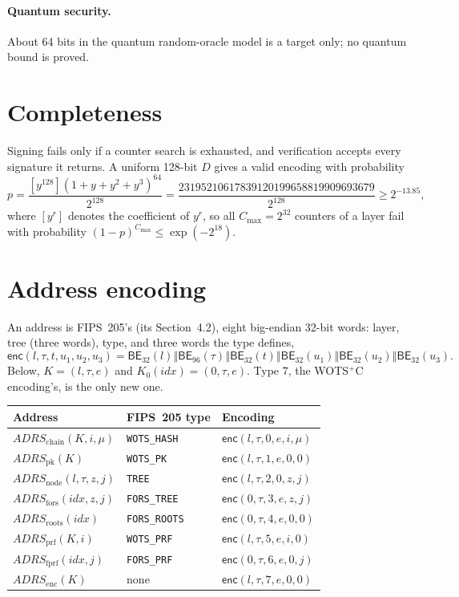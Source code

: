 \documentclass[11pt]{article}
\newcommand{\BE}{\mathsf{BE}}
\newcommand{\concat}{\mathbin\Vert}
\newcommand{\addr}{\mathit{ADRS}}
\newcommand{\cmax}{C_{\max}}
\newcommand{\idx}{\mathit{idx}}
\begin{document}
\paragraph{Quantum security.}
About 64 bits in the quantum random-oracle model is a target only; no quantum bound is proved.

\section{Completeness}
\label{sec:completeness}

Signing fails only if a counter search is exhausted, and verification accepts every signature it returns. A uniform 128-bit $D$ gives a valid encoding with probability
\[
  p=\frac{[y^{128}](1+y+y^2+y^3)^{64}}{2^{128}}
  =\frac{23195210617839120199658819909693679}{2^{128}}
  \geq2^{-13.85},
\]
where $[y^r]$ denotes the coefficient of $y^r$, so all $\cmax=2^{32}$ counters of a layer fail with probability $(1-p)^{\cmax}\leq\exp(-2^{18})$.

\appendix
\section{Address encoding}
\label{sec:address}

An address is FIPS~205's (its Section~4.2), eight big-endian 32-bit words: layer, tree (three words), type, and three words the type defines,
\[
  \mathsf{enc}(l,\tau,t,u_1,u_2,u_3)=\BE_{32}(l)\concat\BE_{96}(\tau)\concat\BE_{32}(t)\concat\BE_{32}(u_1)\concat\BE_{32}(u_2)\concat\BE_{32}(u_3).
\]
Below, $K=(l,\tau,e)$ and $K_0(\idx)=(0,\tau,e)$. Type $7$, the WOTS$^+$C encoding's, is the only new one.

\begin{center}
\small
\begin{tabular}{@{}lll@{}}
\toprule
Address & FIPS~205 type & Encoding\\
\midrule
$\addr_{\mathrm{chain}}(K,i,\mu)$ & \texttt{WOTS\_HASH} & $\mathsf{enc}(l,\tau,0,e,i,\mu)$\\
$\addr_{\mathrm{pk}}(K)$ & \texttt{WOTS\_PK} & $\mathsf{enc}(l,\tau,1,e,0,0)$\\
$\addr_{\mathrm{node}}(l,\tau,z,j)$ & \texttt{TREE} & $\mathsf{enc}(l,\tau,2,0,z,j)$\\
$\addr_{\mathrm{fors}}(\idx,z,j)$ & \texttt{FORS\_TREE} & $\mathsf{enc}(0,\tau,3,e,z,j)$\\
$\addr_{\mathrm{roots}}(\idx)$ & \texttt{FORS\_ROOTS} & $\mathsf{enc}(0,\tau,4,e,0,0)$\\
$\addr_{\mathrm{prf}}(K,i)$ & \texttt{WOTS\_PRF} & $\mathsf{enc}(l,\tau,5,e,i,0)$\\
$\addr_{\mathrm{fprf}}(\idx,j)$ & \texttt{FORS\_PRF} & $\mathsf{enc}(0,\tau,6,e,0,j)$\\
$\addr_{\mathrm{enc}}(K)$ & none & $\mathsf{enc}(l,\tau,7,e,0,0)$\\
\bottomrule
\end{tabular}
\end{center}



\end{document}
